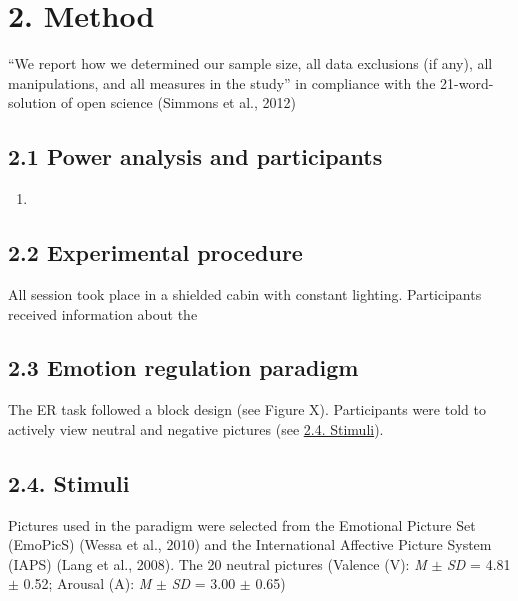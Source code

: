 \documentclass[
]{article}
\author{}
\date{\vspace{-2.5em}}
\providecommand{\tightlist}{%
  \setlength{\itemsep}{0pt}\setlength{\parskip}{0pt}}
\begin{document}
\hypertarget{method}{%
\section{2. Method}\label{method}}

``We report how we determined our sample size, all data exclusions (if
any), all manipulations, and all measures in the study'' in compliance
with the 21-word-solution of open science (Simmons et al., 2012)

\hypertarget{power-analysis-and-participants}{%
\subsection{2.1 Power analysis and
participants}\label{power-analysis-and-participants}}

\begin{enumerate}
\def\labelenumi{\roman{enumi}.}
\setcounter{enumi}{29}
\tightlist
\item
\end{enumerate}

\hypertarget{experimental-procedure}{%
\subsection{2.2 Experimental procedure}\label{experimental-procedure}}

All session took place in a shielded cabin with constant lighting.
Participants received information about the

\hypertarget{emotion-regulation-paradigm}{%
\subsection{2.3 Emotion regulation
paradigm}\label{emotion-regulation-paradigm}}

The ER task followed a block design (see Figure X). Participants were
told to actively view neutral and negative pictures (see
\protect\hyperlink{ux5cux23stimuli}{2.4. Stimuli}).

\hypertarget{stimuli}{%
\subsection{2.4. Stimuli}\label{stimuli}}

Pictures used in the paradigm were selected from the Emotional Picture
Set (EmoPicS) (Wessa et al., 2010) and the International Affective
Picture System (IAPS) (Lang et al., 2008). The 20 neutral pictures
(Valence (V): \emph{M} \(\pm\) \emph{SD} = 4.81 \(\pm\) 0.52; Arousal
(A): \emph{M} \(\pm\) \emph{SD} = 3.00 \(\pm\) 0.65)
\end{document}
